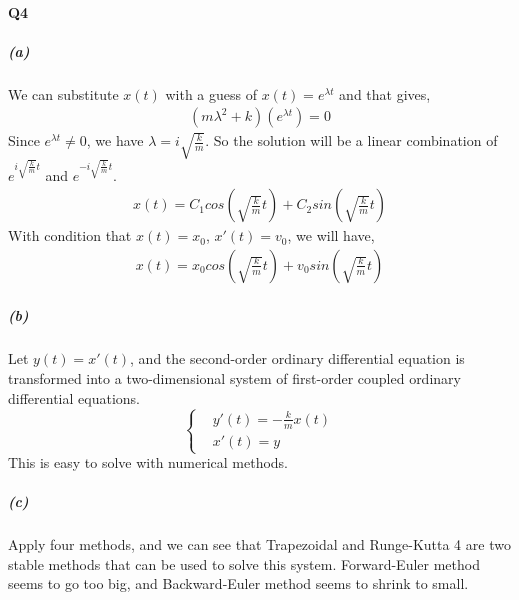 \documentclass[11pt]{article}
\begin{document}
\paragraph{Q4}
\subparagraph{(a)}
We can substitute $x(t)$ with a guess of $x(t)=e^{\lambda t}$ and that gives,
\begin{align}
	(m\lambda^2+k)(e^{\lambda t})=0
\end{align}
Since $e^{\lambda t}\ne 0$, we have $\lambda=i\sqrt{\frac{k}{m}}$. So the solution will be a linear combination of $e^{i\sqrt{\frac{k}{m}}t}$ and $e^{-i\sqrt{\frac{k}{m}}t}$.
\begin{align}
	x(t)=C_1cos(\sqrt{\frac{k}{m}}t)+C_2sin(\sqrt{\frac{k}{m}}t)
\end{align}
With condition that $x(t)=x_0$, $x'(t)=v_0$, we will have,
\begin{align}
	x(t)=x_0cos(\sqrt{\frac{k}{m}}t)+v_0sin(\sqrt{\frac{k}{m}}t)
\end{align}
\subparagraph{(b)}
Let $y(t)=x'(t)$, and the second-order ordinary differential equation is transformed into a two-dimensional system of first-order coupled ordinary differential equations.
\begin{equation}
	\left\{
	\begin{aligned}
		&y'(t)=-\frac{k}{m}x(t)\\
		&x'(t)=y	
	\end{aligned}
	\right.
\end{equation}
This is easy to solve with numerical methods.
\subparagraph{(c)}
Apply four methods, and we can see that Trapezoidal and Runge-Kutta 4 are two stable methods that can be used to solve this system. Forward-Euler method seems to go too big, and Backward-Euler method seems to shrink to small.
\begin{figure}[H]
	\centering
\end{figure}
\end{document}
